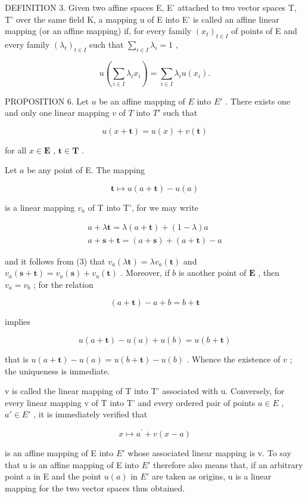 DEFINITION 3. Given two affine spaces E, E' attached to two vector spaces T, T' over the same field K, a mapping u of E into E' is called an affine linear mapping (or an affine mapping) if, for every family \((x_{t})_{t\in I}\) of points of E and every family \((\lambda_{t})_{t\in I}\) such that \(\sum_{i\in I}\lambda_{i}=1\) ,

\[
u \left(\sum_ {i \in I} \lambda_ {i} x _ {i}\right) = \sum_ {i \in I} \lambda_ {i} u (x _ {i}).\tag{3}
\]

PROPOSITION 6. Let \(u\) be an affine mapping of \(E\) into \(E'\) . There exists one and only one linear mapping \(v\) of \(T\) into \(T'\) such that

\[
u (x + \mathbf {t}) = u (x) + v (\mathbf {t})
\]

for all \(x \in \mathbf{E}\) , \(\mathbf{t} \in \mathbf{T}\) .

Let \(a\) be any point of E. The mapping

\[
\mathbf {t} \mapsto u (a + \mathbf {t}) - u (a)
\]

is a linear mapping \(v_{a}\) of T into T', for we may write

\[
\begin{array}{c} a + \lambda \mathbf {t} = \lambda (a + \mathbf {t}) + (1 - \lambda) a \\ a + \mathbf {s} + \mathbf {t} = (a + \mathbf {s}) + (a + \mathbf {t}) - a \end{array}
\]

and it follows from (3) that \(v_{a}(\lambda \mathbf{t}) = \lambda v_{a}(\mathbf{t})\) and \(v_{a}(\mathbf{s} + \mathbf{t}) = v_{a}(\mathbf{s}) + v_{a}(\mathbf{t})\) . Moreover, if \(b\) is another point of \(\mathbf{E}\) , then \(v_{a} = v_{b}\) ; for the relation

\[
(a + \mathbf {t}) - a + b = b + \mathbf {t}
\]

implies

\[
u (a + \mathbf {t}) - u (a) + u (b) = u (b + \mathbf {t})
\]

that is \(u(a + \mathbf{t}) - u(a) = u(b + \mathbf{t}) - u(b)\) . Whence the existence of \(v\) ; the uniqueness is immediate.

v is called the linear mapping of T into T' associated with u. Conversely, for every linear mapping v of T into T' and every ordered pair of points \(a \in E\) , \(a' \in E'\) , it is immediately verified that

\[
x \mapsto a ^ {\prime} + v (x - a)
\]

is an affine mapping of E into \(E'\) whose associated linear mapping is v. To say that u is an affine mapping of E into \(E'\) therefore also means that, if an arbitrary point a in E and the point \(u(a)\) in \(E'\) are taken as origins, u is a linear mapping for the two vector spaces thus obtained.

